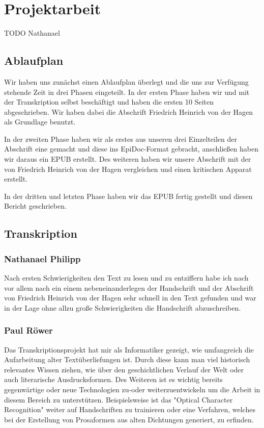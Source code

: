 \documentclass[a4paper, 12pt, oneside]{scrbook}
\begin{document}
\chapter{Projektarbeit}
TODO Nathanael
\section{Ablaufplan}
Wir haben uns zunächst einen Ablaufplan überlegt und die uns zur Verfügung stehende Zeit in drei Phasen eingeteilt. In der ersten Phase haben wir und mit der Transkription selbst beschäftigt und haben die ersten 10 Seiten abgeschrieben. Wir haben dabei die Abschrift Friedrich Heinrich von der Hagen\cite{fhvdh_helden} als Grundlage benutzt.

In der zweiten Phase haben wir als erstes aus unseren drei Einzelteilen der Abschrift eine gemacht und diese ins EpiDoc-Format gebracht, anschließen haben wir daraus ein EPUB erstellt. Des weiteren haben wir unsere Abschrift mit der von Friedrich Heinrich von der Hagen vergleichen und einen kritischen Apparat erstellt.

In der dritten und letzten Phase haben wir das EPUB fertig gestellt und diesen Bericht geschrieben.
\section{Transkription}
\subsection{Nathanael Philipp}
Nach ersten Schwierigkeiten den Text zu lesen und zu entziffern habe ich nach vor allem nach ein einem nebeneinanderlegen der Handschrift und der Abschrift von Friedrich Heinrich von der Hagen sehr schnell in den Text gefunden und war in der Lage ohne allzu große Schwierigkeiten die Handschrift abzuschreiben.

\subsection{Paul Röwer}
Das Transkriptionsprojekt hat mir als Informatiker gezeigt, wie umfangreich die Aufarbeitung alter Textüberliefungen ist. Durch diese kann man viel historisch relevantes Wissen ziehen, wie über den geschichtlichen Verlauf der Welt oder auch literarische Ausdrucksformen. Des Weiteren ist es wichtig bereits gegenwärtige oder neue Technologien  zu-oder weiterzuentwickeln um die Arbeit in diesem Bereich zu unterstützen. Beispielsweise ist das "Optical Character Recognition" weiter auf Handschriften zu trainieren oder eine Verfahren, welches bei der Erstellung von Prosaformen aus alten Dichtungen generiert, zu erfinden.
\end{document}
